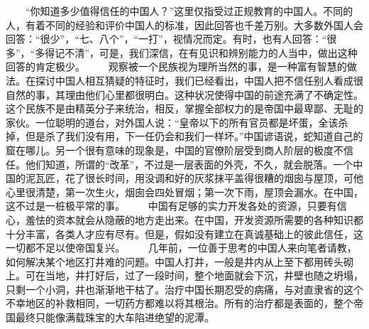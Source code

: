 \documentclass[12pt,oneside]{book}
\begin{document}
\begin{common-format}
　　“你知道多少值得信任的中国人？”这里仅指受过正规教育的中国人。不同的人，有着不同的经验和评价中国人的标准，因此回答也千差万别。大多数外国人会回答：“很少”，“七、八个”，“一打”，视情况而定。有时，也有人回答：“很多”，“多得记不清”，可是，我们深信，在有见识和辨别能力的人当中，做出这种回答的肯定极少。 
　　观察被一个民族视为理所当然的事，是一种富有智慧的做法。在探讨中国人相互猜疑的特征时，我们已经看出，中国人把不信任别人看成很自然的事，其理由他们心里都很明白。这种状况使得中国的前途充满了不确定性。这个民族不是由精英分子来统治，相反，掌握全部权力的是帝国中最卑鄙、无耻的家伙。一位聪明的道台，对外国人说：“皇帝以下的所有官员都是坏蛋，全该杀掉，但是杀了我们没有用，下一任仍会和我们一样坏。”中国谚语说，蛇知道自己的窟在哪儿。另一个很有意味的现象是，中国的官僚阶层受到商人阶层的极度不信任。他们知道，所谓的“改革”，不过是一层表面的外壳，不久，就会脱落。一个中国的泥瓦匠，花了很长时间，用没调和好的灰浆抹平盖得很糟的烟囱与屋顶，可他心里很清楚，第一次生火，烟囱会四处冒烟；第一次下雨，屋顶会漏水。在中国，这不过是一桩极平常的事。 
　　中国有足够的实力开发各处的资源，只要有信心，羞怯的资本就会从隐蔽的地方走出来。在中国，开发资源所需要的各种知识都十分丰富，各类人才应有尽有。但是，假如没有建立在真诚基础上的彼此信任，这一切都不足以使帝国复兴。 
　　几年前，一位善于思考的中国人来向笔者请教，如何解决某个地区打井难的问题。中国人打井，一般是井内从上至下都用砖头砌上。可在当地，井打好后，过了一段时间，整个地面就会下沉，井壁也随之坍塌，只剩一个小洞，井也渐渐地干枯了。治疗中国长期忍受的病痛，与对直隶省的这个不幸地区的补救相同，一切药方都难以将其根治。所有的治疗都是表面的，整个帝国最终只能像满载珠宝的大车陷进绝望的泥潭。 


\end{common-format}
\end{document}
